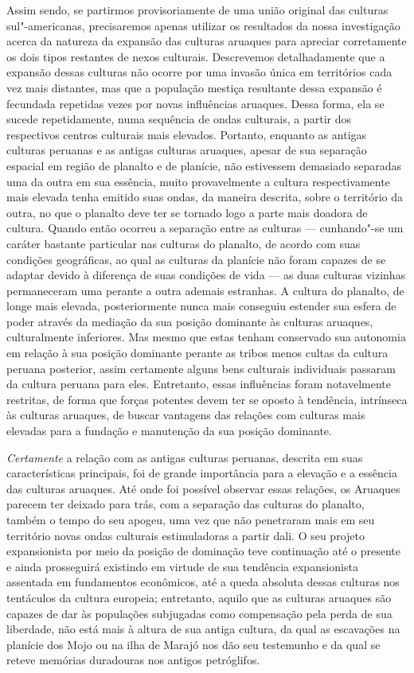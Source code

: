 Assim sendo, se partirmos provisoriamente de uma união original das
culturas sul"-americanas, precisaremos apenas utilizar os resultados
da nossa investigação acerca da natureza da expansão das culturas
aruaques para apreciar corretamente os dois tipos restantes de nexos
culturais. Descrevemos detalhadamente que a expansão dessas culturas não 
ocorre por uma invasão única em territórios cada vez mais
distantes, mas que a população mestiça resultante dessa expansão é
fecundada repetidas vezes por novas influências aruaques. Dessa forma, ela se
sucede repetidamente, numa sequência de ondas culturais, a partir dos
respectivos centros culturais mais elevados. Portanto, enquanto as
antigas culturas peruanas e as antigas culturas aruaques, apesar de sua
separação espacial em região de planalto e de planície, não estivessem
demasiado separadas uma da outra em sua essência, muito provavelmente a
cultura respectivamente mais elevada tenha emitido suas ondas, da maneira
descrita, sobre o território da outra, no que o planalto deve ter se
tornado logo a parte mais doadora de cultura. Quando então ocorreu a
separação entre as culturas --- cunhando"-se um caráter bastante
particular nas culturas do planalto, de acordo com suas condições
geográficas, ao qual as culturas da planície não foram capazes de se
adaptar devido à diferença de suas condições de vida --- as duas
culturas vizinhas permaneceram uma perante a outra ademais estranhas. A
cultura do planalto, de longe mais elevada, posteriormente nunca mais
conseguiu estender sua esfera de poder através da mediação da sua
posição dominante às culturas aruaques, culturalmente inferiores. Mas
mesmo que estas tenham conservado sua autonomia em relação à sua posição
dominante perante as tribos menos cultas da cultura peruana posterior,
assim certamente alguns bens culturais individuais passaram da cultura
peruana para eles. Entretanto, essas influências foram notavelmente
restritas, de forma que forças potentes devem ter se oposto à tendência,
intrínseca às culturas aruaques, de buscar vantagens das relações com
culturas mais elevadas para a fundação e manutenção da sua posição
dominante.

\textit{Certamente} a relação com as antigas culturas peruanas, descrita em suas
características principais, foi de grande importância para a elevação e
a essência das culturas aruaques. Até onde foi possível observar essas
relações, os Aruaques parecem ter deixado para trás, com a separação das
culturas do planalto, também o tempo do seu apogeu, uma vez que não
penetraram mais em seu território novas ondas culturais estimuladoras a
partir dali. O seu projeto expansionista por meio da posição de
dominação teve continuação até o presente e ainda prosseguirá existindo
em virtude de sua tendência expansionista assentada em fundamentos
econômicos, até a queda absoluta dessas culturas nos tentáculos da
cultura europeia; entretanto, aquilo que as culturas aruaques são capazes
de dar às populações subjugadas como compensação pela perda de sua
liberdade, não está mais à altura de sua antiga cultura, da qual as
escavações na planície dos Mojo ou na ilha de Marajó nos dão seu
testemunho e da qual se reteve memórias duradouras nos antigos
petróglifos.

